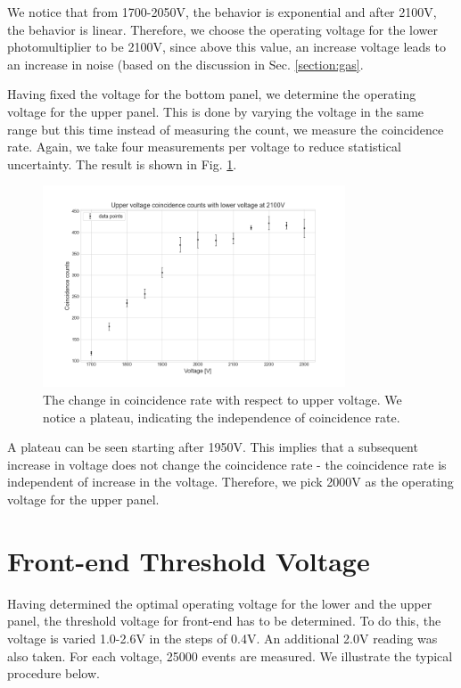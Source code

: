 \documentclass[a4paper]{report}
\numberwithin{equation}{section}
\begin{document}
We notice that from 1700-2050V, the behavior is exponential and after 2100V, the behavior is linear. Therefore, we choose the operating voltage for the lower photomultiplier to be 2100V, since above this value, an increase voltage leads to an increase in noise (based on the discussion in Sec. \ref{section:gas}. 

Having fixed the voltage for the bottom panel, we determine the operating voltage for the upper panel. This is done by varying the voltage in the same range but this time instead of measuring the count, we measure the coincidence rate. Again, we take four measurements per voltage to reduce statistical uncertainty. The result is shown in Fig. \ref{fig:up_count}. 

\begin{figure}[htpb]
    \centering
    \includegraphics[width=0.8\textwidth]{up_count}
    \caption{The change in coincidence rate with respect to upper voltage. We notice a plateau, indicating the independence of coincidence rate.}
    \label{fig:up_count}
\end{figure}

A plateau can be seen starting after 1950V. This implies that a subsequent increase in voltage does not change the coincidence rate - the coincidence rate is independent of increase in the voltage. Therefore, we pick 2000V as the operating voltage for the upper panel. 

\section{Front-end Threshold Voltage} \label{sec:fe_threshhold}

Having determined the optimal operating voltage for the lower and the upper panel, the threshold voltage for front-end has to be determined. To do this, the voltage is varied 1.0-2.6V in the steps of 0.4V. An additional 2.0V reading was also taken. For each voltage, 25000 events are measured. We illustrate the typical procedure below. 
\end{document}
